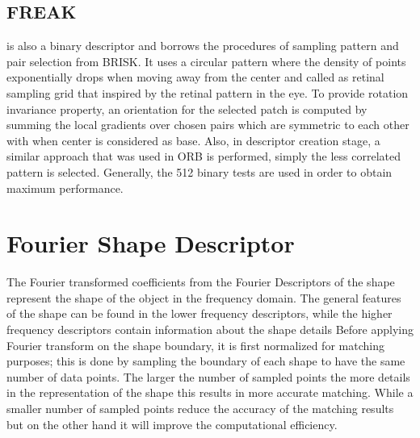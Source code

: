 \subsection{FREAK }
is also a binary descriptor and borrows the 
procedures of sampling pattern and pair selection from BRISK. 
It uses a circular pattern where the density of points exponentially
drops when moving away from the center and called as retinal
sampling grid that inspired by the retinal pattern in the eye. To
provide rotation invariance property, an orientation for the 
selected patch is computed by summing the local gradients over
chosen pairs which are symmetric to each other with when center
is considered as base. Also, in descriptor creation stage, a similar
approach that was used in ORB is performed, simply the less
correlated pattern is selected. Generally, the 512 binary tests are
used in order to obtain maximum performance. 


\section{Fourier Shape Descriptor } \label{FDT}
The Fourier transformed coefficients from the Fourier
Descriptors of the shape represent the shape of the object in
the frequency domain. The general features of the shape can
be found in the lower frequency descriptors, while the higher
frequency descriptors contain information about the shape
details \cite{20}
Before applying Fourier transform on the shape boundary, it
is first normalized for matching purposes; this is done by
sampling the boundary of each shape to have the same number
of data points. The larger the number of sampled points the
more details in the representation of the shape this results in
more accurate matching. While a smaller number of sampled
points reduce the accuracy of the matching results but on the
other hand it will improve the computational efficiency. \\

